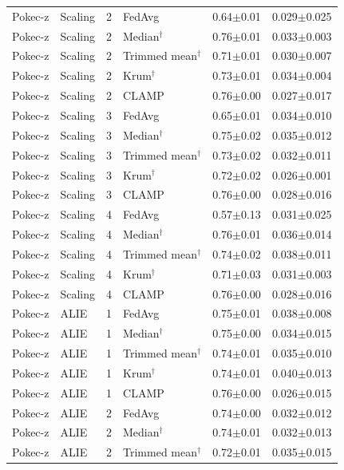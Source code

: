\begin{longtable}{llclcc}
Pokec-z & Scaling & 2 & FedAvg & 0.64$\pm$0.01 & 0.029$\pm$0.025 \\
Pokec-z & Scaling & 2 & Median$^\dagger$ & 0.76$\pm$0.01 & 0.033$\pm$0.003 \\
Pokec-z & Scaling & 2 & Trimmed mean$^\dagger$ & 0.71$\pm$0.01 & 0.030$\pm$0.007 \\
Pokec-z & Scaling & 2 & Krum$^\dagger$ & 0.73$\pm$0.01 & 0.034$\pm$0.004 \\
Pokec-z & Scaling & 2 & CLAMP & 0.76$\pm$0.00 & 0.027$\pm$0.017 \\
Pokec-z & Scaling & 3 & FedAvg & 0.65$\pm$0.01 & 0.034$\pm$0.010 \\
Pokec-z & Scaling & 3 & Median$^\dagger$ & 0.75$\pm$0.02 & 0.035$\pm$0.012 \\
Pokec-z & Scaling & 3 & Trimmed mean$^\dagger$ & 0.73$\pm$0.02 & 0.032$\pm$0.011 \\
Pokec-z & Scaling & 3 & Krum$^\dagger$ & 0.72$\pm$0.02 & 0.026$\pm$0.001 \\
Pokec-z & Scaling & 3 & CLAMP & 0.76$\pm$0.00 & 0.028$\pm$0.016 \\
Pokec-z & Scaling & 4 & FedAvg & 0.57$\pm$0.13 & 0.031$\pm$0.025 \\
Pokec-z & Scaling & 4 & Median$^\dagger$ & 0.76$\pm$0.01 & 0.036$\pm$0.014 \\
Pokec-z & Scaling & 4 & Trimmed mean$^\dagger$ & 0.74$\pm$0.02 & 0.038$\pm$0.011 \\
Pokec-z & Scaling & 4 & Krum$^\dagger$ & 0.71$\pm$0.03 & 0.031$\pm$0.003 \\
Pokec-z & Scaling & 4 & CLAMP & 0.76$\pm$0.00 & 0.028$\pm$0.016 \\
Pokec-z & ALIE & 1 & FedAvg & 0.75$\pm$0.01 & 0.038$\pm$0.008 \\
Pokec-z & ALIE & 1 & Median$^\dagger$ & 0.75$\pm$0.00 & 0.034$\pm$0.015 \\
Pokec-z & ALIE & 1 & Trimmed mean$^\dagger$ & 0.74$\pm$0.01 & 0.035$\pm$0.010 \\
Pokec-z & ALIE & 1 & Krum$^\dagger$ & 0.74$\pm$0.01 & 0.040$\pm$0.013 \\
Pokec-z & ALIE & 1 & CLAMP & 0.76$\pm$0.00 & 0.026$\pm$0.015 \\
Pokec-z & ALIE & 2 & FedAvg & 0.74$\pm$0.00 & 0.032$\pm$0.012 \\
Pokec-z & ALIE & 2 & Median$^\dagger$ & 0.74$\pm$0.01 & 0.032$\pm$0.013 \\
Pokec-z & ALIE & 2 & Trimmed mean$^\dagger$ & 0.72$\pm$0.01 & 0.035$\pm$0.015 \\

\end{longtable}
